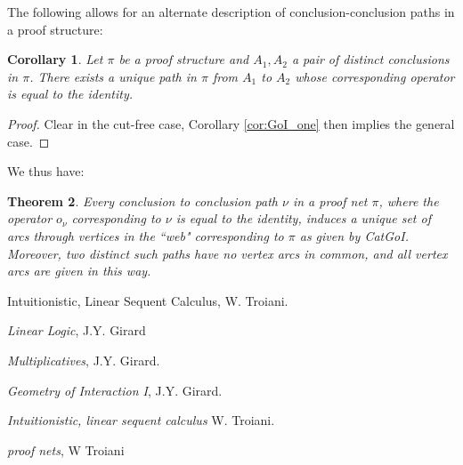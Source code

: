 \documentclass[12pt]{article}
\theoremstyle{plain}
\newtheorem{thm}{Theorem}[subsection] %
\newtheorem{cor}[thm]{Corollary}
\theoremstyle{definition}
\begin{document}
	The following allows for an alternate description of conclusion-conclusion paths in a proof structure:
	\begin{cor}
		Let $\pi$ be a proof structure and $A_1,A_2$ a pair of distinct conclusions in $\pi$. There exists a unique path in $\pi$ from $A_1$ to $A_2$ whose corresponding operator is equal to the identity.
	\end{cor}
	\begin{proof}
		Clear in the cut-free case, Corollary \ref{cor:GoI_one} then implies the general case.
	\end{proof}
	We thus have:
	\begin{thm}
		Every conclusion to conclusion path $\nu$ in a proof net $\pi$, where the operator $o_{\nu}$ corresponding to $\nu$ is equal to the identity, induces a unique set of arcs through vertices in the ``web" corresponding to $\pi$ as given by \emph{CatGoI}. Moreover, two distinct such paths have no vertex arcs in common, and all vertex arcs are given in this way.
	\end{thm}
	
	
	
	
	
	
	
	
	
	
	
	
	
	
	
	
	
	
	
	
	
	
	
	
	
	
	
	
	
	
	
	
	
	
	
	
	
	
	
	
	
	
	
	
	
	
	
	
	
	\providecommand{\bysame}{\leavevmode\hbox to3em{\hrulefill}\thinspace}
	\providecommand{\href}[2]{#2}
	\begin{thebibliography}{99}
		 Intuitionistic, Linear Sequent Calculus, W. Troiani.
		
		 \emph{Linear Logic}, J.Y. Girard
		
		 \emph{Multiplicatives}, J.Y. Girard.
		
		 \emph{Geometry of Interaction I}, J.Y. Girard.
		
		 \emph{Intuitionistic, linear sequent calculus} W. Troiani.
		
		 \emph{proof nets}, W Troiani
		
		
	\end{thebibliography}
\end{document}

